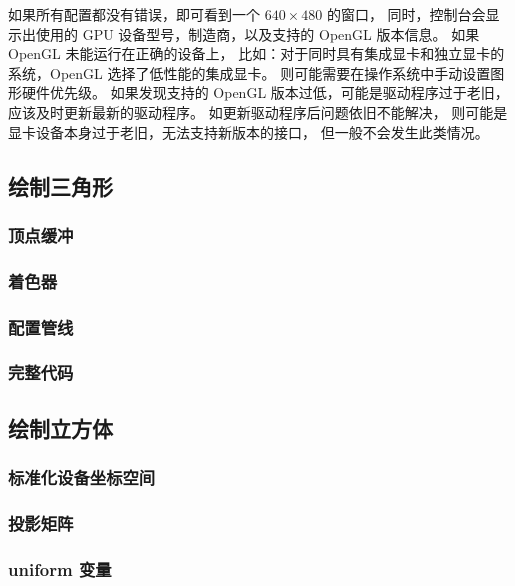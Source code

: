 \documentclass[fontset=windows]{ctexart}
\begin{document}
如果所有配置都没有错误，即可看到一个 $640\times 480$ 的窗口，
同时，控制台会显示出使用的 GPU 设备型号，制造商，以及支持的 OpenGL 版本信息。
如果 OpenGL 未能运行在正确的设备上，
比如：对于同时具有集成显卡和独立显卡的系统，OpenGL 选择了低性能的集成显卡。
则可能需要在操作系统中手动设置图形硬件优先级。
如果发现支持的 OpenGL 版本过低，可能是驱动程序过于老旧，
应该及时更新最新的驱动程序。
如更新驱动程序后问题依旧不能解决，
则可能是显卡设备本身过于老旧，无法支持新版本的接口，
但一般不会发生此类情况。

\label{sec-gl:creating-opengl-window}

\subsection{绘制三角形}

\subsubsection{顶点缓冲}

\subsubsection{着色器}

\subsubsection{配置管线}

\subsubsection{完整代码}

\subsection{绘制立方体}

\subsubsection{标准化设备坐标空间}

\subsubsection{投影矩阵}

\subsubsection{uniform 变量}
\end{document}
